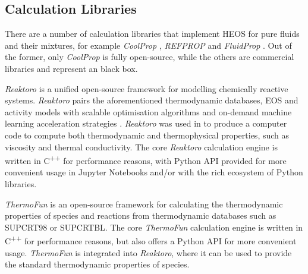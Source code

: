 \subsection{Calculation Libraries}
\label{sec:calc_frameworks}
    There are a number of calculation libraries that implement \ac{HEOS} for pure fluids and their mixtures, for example \emph{CoolProp} \cite{Bell2014}, \emph{REFPROP} \cite{Lemmon2018} and \emph{FluidProp} \cite{Colonna2019}. Out of the former, only \emph{CoolProp} is fully open-source, while the others are commercial libraries and represent an black box.

    \emph{Reaktoro} \cite{Leal2015} is a unified open-source framework for modelling chemically reactive systems. \emph{Reaktoro} pairs the aforementioned thermodynamic databases, \ac{EOS} and activity models with scalable optimisation algorithms \cite{Leal2017} and on-demand machine learning acceleration strategies \cite{Kyas2022, Leal2020}. \emph{Reaktoro} was used in \citeauthor{Walsh2017} to produce a computer code to compute both thermodynamic and thermophysical properties, such as viscosity and thermal conductivity. The core \emph{Reaktoro} calculation engine is written in C\textsuperscript{++} for performance reasons, with Python API provided for more convenient usage in Jupyter Notebooks and/or with the rich ecosystem of Python libraries.

    \emph{ThermoFun} \cite{Miron2021} is an open-source framework for calculating the thermodynamic properties of species and reactions from thermodynamic databases such as SUPCRT98 or SUPCRTBL. The core \emph{ThermoFun} calculation engine is written in C\textsuperscript{++} for performance reasons, but also offers a Python API for more convenient usage. \emph{ThermoFun} is integrated into \emph{Reaktoro}, where it can be used to provide the standard thermodynamic properties of species.

